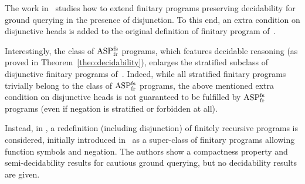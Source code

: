 \documentclass{tlp}
\newcommand{\nop}[1]{}
\newcommand{\Or}{\ensuremath{\mathtt{\,v\,}}\xspace}
\newcommand{\derives}{\ensuremath{\mathtt{\ :\!\!-}\ }}
\newenvironment{dlvcode2}
  {\begin{displaymath}\begin{array}{ll}}
  {\end{array}\end{displaymath}}
\newcommand{\implied}{\derives}
\newcommand{\ASPFNFR}{\ensuremath{\rm ASP^{\rm fs}_{\rm fr}}}
\begin{document}
The work in~\cite{bona-02-iclp} studies how to extend
finitary programs \cite{bona-04} preserving decidability
for ground querying in the presence of disjunction. To this
end, an extra condition on disjunctive heads is added to the
original definition of finitary program of~\cite{bona-04}.
\nop{
Given a dependency relation which considers only
connections between head and body atoms (that is, $a
\dependson b$ iff there exists $r$ such that $a \in H(r)$
and $b \in B(r)$), a disjunctive program $P$ is finitary in
the sense of \cite{bona-02-iclp} if {\em (1)}~each ground
atom in $P$ depends on finitely many other atoms, {\em (2)}
the set $S$ of atoms appearing in odd-negated cycles is
finite and {\em (3)} the set $R$ of atoms $a$ for which
there is a rule $r \in P$ in which $a \in
max_{\dependson}(H(r))$ and there is an atom $b \in H(r)$
which is recursive with $a$ and $a$ positively depends on
$b$, is finite \footnote{Given erratum
\cite{bona-err-2008}, it turns out that both $S$ and $R$
must be known besides being finite.}.
}
Interestingly, the class of \ASPFNFR{} programs,
which features decidable reasoning (as proved in
Theorem~\ref{theo:decidability}), enlarges the stratified
subclass of disjunctive finitary programs
of~\cite{bona-02-iclp}. Indeed, while all stratified finitary
programs trivially belong to the class of \ASPFNFR{} programs,
the above mentioned extra condition on disjunctive heads is not guaranteed to be
fulfilled by \ASPFNFR{} programs
(even if negation is stratified or forbidden at all).
\nop{
as witnessed by the following program:
\begin{dlvcode2}
p(X) \Or q(X) \implied\ s(X).\qquad\qquad & q(X) \implied\ p(X). \\
p(f(X)) \implied\ q(X). & p(1). \\
p(X) \implied\ q(X). \\
\end{dlvcode2}
}
Instead, in \cite{base-etal-2009-tplp}, 
a redefinition (including disjunction) of
finitely recursive programs is considered, initially introduced
in~\cite{bona-04} as a super-class of finitary programs
allowing function symbols and negation. The authors show
a compactness property and semi-decidability results for cautious ground
querying, but no decidability results are given.
\end{document}
